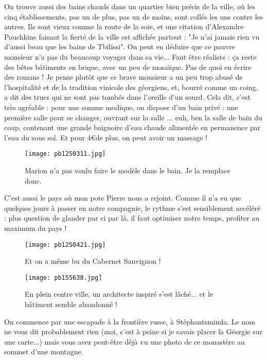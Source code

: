 \documentclass{book}
\begin{document}
On trouve aussi des bains chauds dans un quartier bien précis de la ville, où les cinq établissements, pas un de plus, pas un de moins, sont collés les uns contre les autres. Ils sont vieux comme la route de la soie, et une citation d'Alexandre Pouchkine faisant la fierté de la ville est affichée partout : "Je n'ai jamais rien vu d'aussi beau que les bains de Tbilissi". On peut en déduire que ce pauvre monsieur n'a pas du beaucoup voyager dans sa vie... Faut être réaliste : ça reste des bêtes bâtiments en brique, avec un peu de mosaïque. Pas de quoi en écrire des romans ! Je pense plutôt que ce brave monsieur a un peu trop abusé de l'hospitalité et de la tradition vinicole des géorgiens, et, bourré comme un coing, a dit des trucs qui ne sont pas tombés dans l'oreille d'un sourd. Cela dit, c'est très agréable : pour une somme modique, on dispose d'un bain privé : une première salle pour se changer, ouvrant sur la salle ... euh, ben la salle de bain du coup, contenant une grande baignoire d'eau chaude alimentée en permanence par l'eau du sous sol. Et pour 4\euro de plus, on peut avoir un massage !


\begin{figure}[h]
\centering
\texttt{[image: pb1250311.jpg]}
\caption*{Marion n'a pas voulu faire le modèle dans le bain. Je la remplace donc.}
\end{figure}

C'est aussi le pays où mon pote Pierre nous a rejoint. Comme il n'a eu que quelques jours à passer en notre compagnie, le rythme s'est sensiblement accéléré : plus question de glander par ci par là, il faut optimiser notre temps, profiter au maximum du pays !




\begin{figure}[h]
\centering
\texttt{[image: pb1250421.jpg]}
\caption*{Et on a même bu du Cabernet Sauvignon !}
\end{figure}


\begin{figure}[h]
\centering
\texttt{[image: pb155638.jpg]}
\caption*{En plein centre ville, un architecte inspiré s'est lâché... et le bâtiment semble abandonné !}
\end{figure}

On commence par une escapade à la frontière russe, à Stéphantsminda. Le nom ne vous dit probablement rien (moi, c'est à peine si je savais placer la Géorgie sur une carte...) mais vous avez peut-être déjà vu une photo de ce monastère au sommet d'une montagne.
\end{document}
